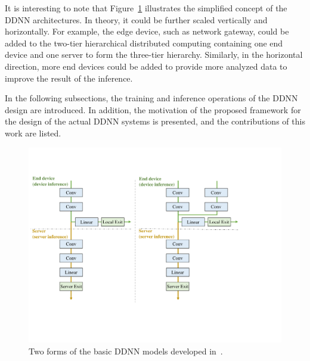 \documentclass[conference]{IEEEtran}
\def\figurename{Figure}
\begin{document}
It is interesting to note that \figurename~\ref{fig:ddnnmodels} illustrates the simplified concept of the DDNN architectures. In theory, it could be further scaled vertically and horizontally. For example, the edge device, such as network gateway, could be added to the two-tier hierarchical distributed computing containing one end device and one server to form the three-tier hierarchy. Similarly, in the horizontal direction, more end devices could be added to provide more analyzed data to improve the result of the inference.

In the following subsections, the training and inference operations of the DDNN design are introduced. In addition, the motivation of the proposed framework for the design of the actual DDNN systems is presented, and the contributions of this work are listed.

	\begin{figure}[htb!]
        \centering

        \includegraphics[width=\columnwidth]{figure/DDNN_models.pdf}

        \caption{Two forms of the basic DDNN models developed in~\cite{Teerapittayanon17}.}
        \label{fig:ddnnmodels} %
    \end{figure}
\end{document}

